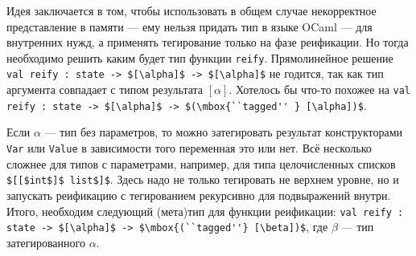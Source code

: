 Идея заключается в том, чтобы использовать в общем случае некорректное представление в памяти --- ему нельзя придать тип в языке OCaml --- для внутренних нужд, а применять тегирование только на фазе реификации. Но тогда необходимо решить каким будет тип функции \lstinline|reify|.
Прямолинейное решение \lstinline|val reify : state -> $[\alpha]$ -> $[\alpha]$|
не годится, так как тип аргумента совпадает с типом результата $[\alpha]$.
Хотелось бы что-то похожее на \lstinline|val reify : state -> $[\alpha]$ -> $(\mbox{``tagged'' } [\alpha])$|.

%

Если $\alpha$ --- тип без параметров, то можно затегировать результат конструкторами \lstinline|Var| или \lstinline|Value|  в зависимости того переменная это или нет.
Всё несколько сложнее для типов с параметрами, например, для типа целочисленных списков \lstinline|$[[$int$]$ list$]$|.
Здесь надо не только тегировать не верхнем уровне, но и запускать реификацию с тегированием рекурсивно для подвыражений внутри.
Итого, необходим следующий (мета)тип для функции реификации: \lstinline|val reify : state -> $[\alpha]$ -> $\mbox{(``tagged''} [\beta])$|,
%
%
%
где $\beta$ --- тип затегированного $\alpha$.

